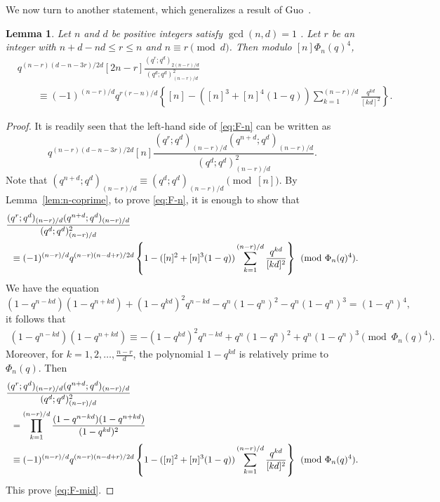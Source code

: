 \documentclass[12pt]{article}
\newtheorem{lem}[thm]{Lemma}
\numberwithin{equation}{section}
\begin{document}
We now turn to another statement, which generalizes a result of Guo~\cite[Lemma~2.3]{Guo-qE2F2}.
\begin{lem}\label{lem:F-n}
    Let $n$ and $d$ be positive integers satisfy $\gcd(n,d)=1$ . Let $r$ be an integer with $n+d-nd\leqslant r \leqslant n$ and $n\equiv r\pmod{d}$. Then modulo $[n]\Phi_n(q)^4$,
    \begin{align}\label{eq:F-n}
        &q^{(n-r)(d-n-3r)/2d}[2n-r]\frac{(q^r;q^d)_{2(n-r)/d}}{(q^d;q^d)^2_{(n-r)/d}}\nonumber\\
        &\hspace{2em}\equiv(-1)^{(n-r)/d} q^{r(r-n)/d}\left\{[n]-([n]^3+[n]^4(1-q))\sum_{k=1}^{(n-r)/d}\frac{q^{kd}}{[kd]^2}\right\}.
    \end{align}
\end{lem}
\begin{proof}
    It is readily seen that the left-hand side of \eqref{eq:F-n} can be written as
    \[q^{(n-r)(d-n-3r)/2d}[n]\frac{(q^r;q^d)_{(n-r)/d}(q^{n+d};q^d)_{(n-r)/d}}{(q^d;q^d)_{(n-r)/d}^2}.\]
    Note that $(q^{n+d};q^d)_{(n-r)/d}\equiv (q^d;q^d)_{(n-r)/d}\pmod{[n]}$. By Lemma~\ref{lem:n-coprime}, to prove \eqref{eq:F-n}, it is enough to 
    show that 
    \begin{align}\label{eq:F-mid}
        &\frac{(q^r;q^d)_{(n-r)/d}(q^{n+d};q^d)_{(n-r)/d}}{(q^d;q^d)_{(n-r)/d}^2}\nonumber\\
        &\hspace{0.5em}\equiv (-1)^{(n-r)/d}q^{(n-r)(n-d+r)/2d}\left\{1-([n]^2+[n]^3(1-q))\sum_{k=1}^{(n-r)/d}\frac{q^{kd}}{[kd]^2}\right\}\pmod{\Phi_n(q)^4}.
    \end{align}
    We have the equation
    \[(1-q^{n-kd})(1-q^{n+kd})+(1-q^{kd})^2q^{n-kd}-q^n(1-q^n)^2-q^n(1-q^n)^3=(1-q^n)^4,\]
    it follows that 
    \begin{align*}
        (1-q^{n-kd})(1-q^{n+kd})\equiv-(1-q^{kd})^2q^{n-kd}+q^n(1-q^n)^2+q^n(1-q^n)^3\pmod{\Phi_n(q)^4}.
    \end{align*}
    Moreover, for $k=1,2,\dots,\frac{n-r}{d}$, the polynomial $1-q^{kd}$ is relatively prime to $\Phi_n(q)$. Then
    \begin{align*}
        &\frac{(q^r;q^d)_{(n-r)/d}(q^{n+d};q^d)_{(n-r)/d}}{(q^d;q^d)_{(n-r)/d}^2}\\
        &\hspace{0.5em}=\prod_{k=1}^{(n-r)/d}\frac{(1-q^{n-kd})(1-q^{n+kd})}{(1-q^{kd})^2}\\
        &\hspace{0.5em}\equiv(-1)^{(n-r)/d}q^{(n-r)(n-d+r)/2d}\left\{1-([n]^2+[n]^3(1-q))\sum_{k=1}^{(n-r)/d}\frac{q^{kd}}{[kd]^2}\right\}\pmod{\Phi_n(q)^4}.
    \end{align*}      
    This prove \eqref{eq:F-mid}.
\end{proof}
\end{document}
